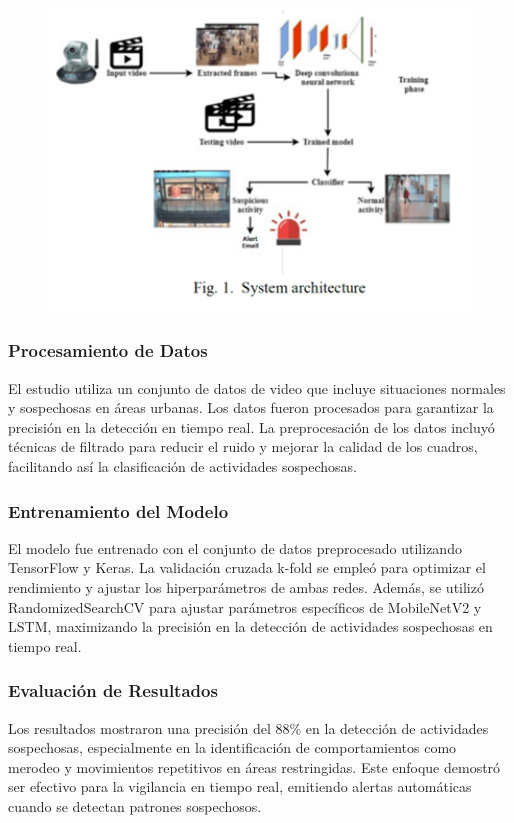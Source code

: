 \documentclass[listof=nochaptergap,12pt,times,authoryear]{report}
\begin{document}
\begin{figure}[h] %
    \centering
    \includegraphics[width=1.0\textwidth]{met2.png} %
    \label{fig:ejemplo} %
\end{figure}

\clearpage

\subsubsection{Procesamiento de Datos}
El estudio utiliza un conjunto de datos de video que incluye situaciones normales y sospechosas en áreas urbanas. Los datos fueron procesados para garantizar la precisión en la detección en tiempo real. La preprocesación de los datos incluyó técnicas de filtrado para reducir el ruido y mejorar la calidad de los cuadros, facilitando así la clasificación de actividades sospechosas.

\subsubsection{Entrenamiento del Modelo}
El modelo fue entrenado con el conjunto de datos preprocesado utilizando TensorFlow y Keras. La validación cruzada k-fold se empleó para optimizar el rendimiento y ajustar los hiperparámetros de ambas redes. Además, se utilizó RandomizedSearchCV para ajustar parámetros específicos de MobileNetV2 y LSTM, maximizando la precisión en la detección de actividades sospechosas en tiempo real.

\subsubsection{Evaluación de Resultados}
Los resultados mostraron una precisión del 88\% en la detección de actividades sospechosas, especialmente en la identificación de comportamientos como merodeo y movimientos repetitivos en áreas restringidas. Este enfoque demostró ser efectivo para la vigilancia en tiempo real, emitiendo alertas automáticas cuando se detectan patrones sospechosos.
\end{document}
